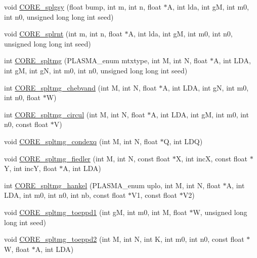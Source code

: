 \begin{DoxyCompactItemize}
\item 
void \hyperlink{group__CORE__float_ga770daf6b30ec924993d47bdaf8f59ac7_ga770daf6b30ec924993d47bdaf8f59ac7}{C\+O\+R\+E\+\_\+splgsy} (float bump, int m, int n, float $\ast$A, int lda, int g\+M, int m0, int n0, unsigned long long int seed)
\item 
void \hyperlink{group__CORE__float_gab613db81f542b8199b165d42b3664b8a_gab613db81f542b8199b165d42b3664b8a}{C\+O\+R\+E\+\_\+splrnt} (int m, int n, float $\ast$A, int lda, int g\+M, int m0, int n0, unsigned long long int seed)
\item 
int \hyperlink{group__CORE__float_ga69d5e618a6713a1e5afd9a6fd5d11e50_ga69d5e618a6713a1e5afd9a6fd5d11e50}{C\+O\+R\+E\+\_\+spltmg} (P\+L\+A\+S\+M\+A\+\_\+enum mtxtype, int M, int N, float $\ast$A, int L\+D\+A, int g\+M, int g\+N, int m0, int n0, unsigned long long int seed)
\item 
int \hyperlink{group__CORE__float_ga42fece77ab9c4a16958022bfaee162ab_ga42fece77ab9c4a16958022bfaee162ab}{C\+O\+R\+E\+\_\+spltmg\+\_\+chebvand} (int M, int N, float $\ast$A, int L\+D\+A, int g\+N, int m0, int n0, float $\ast$W)
\item 
int \hyperlink{group__CORE__float_gaa57da97ce0f2d181a3d60af78d4b267d_gaa57da97ce0f2d181a3d60af78d4b267d}{C\+O\+R\+E\+\_\+spltmg\+\_\+circul} (int M, int N, float $\ast$A, int L\+D\+A, int g\+M, int m0, int n0, const float $\ast$V)
\item 
void \hyperlink{group__CORE__float_ga6c6577979cc9736e37c03f8deb659571_ga6c6577979cc9736e37c03f8deb659571}{C\+O\+R\+E\+\_\+spltmg\+\_\+condexq} (int M, int N, float $\ast$Q, int L\+D\+Q)
\item 
void \hyperlink{group__CORE__float_ga975f3edd4db92b9e102373d3f5a9e489_ga975f3edd4db92b9e102373d3f5a9e489}{C\+O\+R\+E\+\_\+spltmg\+\_\+fiedler} (int M, int N, const float $\ast$X, int inc\+X, const float $\ast$Y, int inc\+Y, float $\ast$A, int L\+D\+A)
\item 
int \hyperlink{group__CORE__float_gaf681e3aade534745d3ee60634915caed_gaf681e3aade534745d3ee60634915caed}{C\+O\+R\+E\+\_\+spltmg\+\_\+hankel} (P\+L\+A\+S\+M\+A\+\_\+enum uplo, int M, int N, float $\ast$A, int L\+D\+A, int m0, int n0, int nb, const float $\ast$V1, const float $\ast$V2)
\item 
void \hyperlink{group__CORE__float_gaa3bc46c759efaec8ffffa2f29b22e556_gaa3bc46c759efaec8ffffa2f29b22e556}{C\+O\+R\+E\+\_\+spltmg\+\_\+toeppd1} (int g\+M, int m0, int M, float $\ast$W, unsigned long long int seed)
\item 
void \hyperlink{group__CORE__float_ga14e3fe8fe7240a6db113af4fe18acdeb_ga14e3fe8fe7240a6db113af4fe18acdeb}{C\+O\+R\+E\+\_\+spltmg\+\_\+toeppd2} (int M, int N, int K, int m0, int n0, const float $\ast$W, float $\ast$A, int L\+D\+A)

\end{DoxyCompactItemize}
